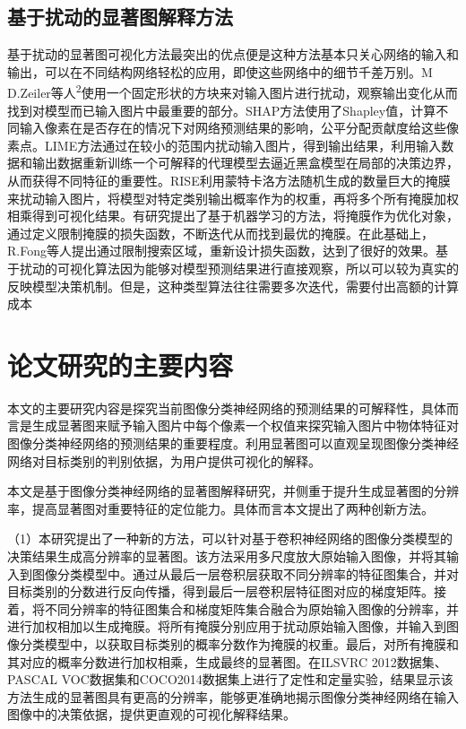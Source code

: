 \subsection{基于扰动的显著图解释方法}
基于扰动的显著图可视化方法最突出的优点便是这种方法基本只关心网络的输入和输出，可以在不同结构网络轻松的应用，即使这些网络中的细节千差万别。M D.Zeiler等人\textsuperscript{\cite{zeiler2014visualizing}2}使用一个固定形状的方块来对输入图片进行扰动，观察输出变化从而找到对模型而已输入图片中最重要的部分。SHAP方法\textsuperscript{\cite{lundberg2017unified}}使用了Shapley值，计算不同输入像素在是否存在的情况下对网络预测结果的影响，公平分配贡献度给这些像素点。LIME\textsuperscript{\cite{ribeiro2016should}}方法通过在较小的范围内扰动输入图片，得到输出结果，利用输入数据和输出数据重新训练一个可解释的代理模型去逼近黑盒模型在局部的决策边界，从而获得不同特征的重要性。RISE\textsuperscript{\cite{petsiuk2018rise}}利用蒙特卡洛方法随机生成的数量巨大的掩膜来扰动输入图片，将模型对特定类别输出概率作为的权重，再将多个所有掩膜加权相乘得到可视化结果。有研究提出了基于机器学习的方法，将掩膜作为优化对象，通过定义限制掩膜的损失函数，不断迭代从而找到最优的掩膜。在此基础上，R.Fong等人\textsuperscript{\cite{fong2019understanding}\cite{fong2017interpretable}}提出通过限制搜索区域，重新设计损失函数，达到了很好的效果。基于扰动的可视化算法因为能够对模型预测结果进行直接观察，所以可以较为真实的反映模型决策机制。但是，这种类型算法往往需要多次迭代，需要付出高额的计算成本

\section{论文研究的主要内容}
本文的主要研究内容是探究当前图像分类神经网络的预测结果的可解释性，具体而言是生成显著图来赋予输入图片中每个像素一个权值来探究输入图片中物体特征对图像分类神经网络的预测结果的重要程度。利用显著图可以直观呈现图像分类神经网络对目标类别的判别依据，为用户提供可视化的解释。  

本文是基于图像分类神经网络的显著图解释研究，并侧重于提升生成显著图的分辨率，提高显著图对重要特征的定位能力。具体而言本文提出了两种创新方法。

（1）本研究提出了一种新的方法，可以针对基于卷积神经网络的图像分类模型的决策结果生成高分辨率的显著图。该方法采用多尺度放大原始输入图像，并将其输入到图像分类模型中。通过从最后一层卷积层获取不同分辨率的特征图集合，并对目标类别的分数进行反向传播，得到最后一层卷积层特征图对应的梯度矩阵。接着，将不同分辨率的特征图集合和梯度矩阵集合融合为原始输入图像的分辨率，并进行加权相加以生成掩膜。将所有掩膜分别应用于扰动原始输入图像，并输入到图像分类模型中，以获取目标类别的概率分数作为掩膜的权重。最后，对所有掩膜和其对应的概率分数进行加权相乘，生成最终的显著图。在ILSVRC 2012数据集\textsuperscript{\cite{ILSVRC}}、PASCAL VOC数据集\textsuperscript{\cite{pascal}}和COCO2014数据集\textsuperscript{\cite{coco}}上进行了定性和定量实验，结果显示该方法生成的显著图具有更高的分辨率，能够更准确地揭示图像分类神经网络在输入图像中的决策依据，提供更直观的可视化解释结果。

